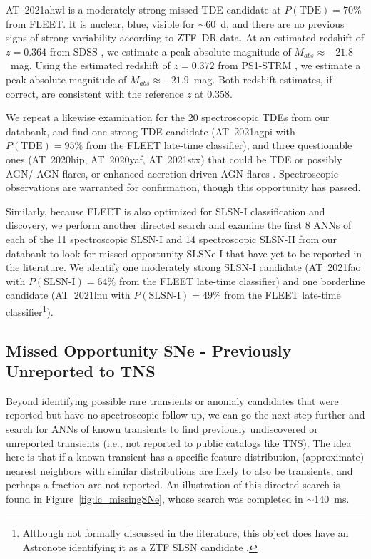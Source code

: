 \documentclass[twocolumn]{aastex63}
\begin{document}
AT~2021ahwl is a moderately strong missed TDE candidate at $P(\text{TDE})=70\%$ from FLEET. It is nuclear, blue, visible for $\sim$60~d, and there are no previous signs of strong variability according to ZTF~DR data. At an estimated redshift of $z=0.364$ from SDSS \citep{Csabai2003}, we estimate a peak absolute magnitude of $M_{abs}\approx-21.8$~mag. Using the estimated redshift of $z=0.372$ from PS1-STRM \citep{Beck2021}, we estimate a peak absolute magnitude of $M_{abs}\approx-21.9$~mag. Both redshift estimates, if correct, are consistent with the reference $z$ at 0.358. \par

We repeat a likewise examination for the 20 spectroscopic TDEs from our databank, and find one strong TDE candidate (AT~2021agpi with $P(\text{TDE})=95\%$ from the FLEET late-time classifier), and three questionable ones (AT~2020hip, AT~2020yaf, AT~2021stx) that could be TDE or possibly AGN/ AGN flares, or enhanced accretion-driven AGN flares \citep{Trakhtenbrot2019}. Spectroscopic observations are warranted for confirmation, though this opportunity has passed. \par

Similarly, because FLEET is also optimized for SLSN-I classification and discovery, we perform another directed search and examine the first 8 ANNs of each of the 11 spectroscopic SLSN-I and 14 spectroscopic SLSN-II from our databank to look for missed opportunity SLSNe-I that have yet to be reported in the literature. We identify one moderately strong SLSN-I candidate (AT~2021fao with $P(\text{SLSN-I})=64\%$ from the FLEET late-time classifier) and one borderline candidate (AT~2021lnu with $P(\text{SLSN-I})=49\%$ from the FLEET late-time classifier\footnote{Although not formally discussed in the literature, this object does have an Astronote identifying it as a ZTF SLSN candidate \citep{Perley2021lnu}.}). \par


\subsection{Missed Opportunity SNe - Previously Unreported to TNS}  \label{subsec:previously_unreported}

Beyond identifying possible rare transients or anomaly candidates that were reported but have no spectroscopic follow-up, we can go the next step further and search for ANNs of known transients to find previously undiscovered or unreported transients (i.e., not reported to public catalogs like TNS). The idea here is that if a known transient has a specific feature distribution, (approximate) nearest neighbors with similar distributions are likely to also be transients, and perhaps a fraction are not reported. An illustration of this directed search is found in Figure~\ref{fig:lc_missingSNe}, whose search was completed in $\sim$140~ms.
\end{document}
